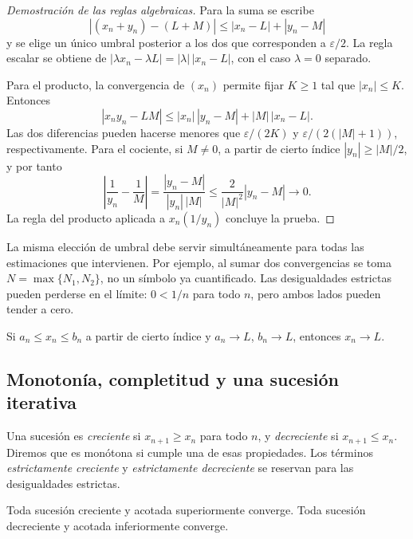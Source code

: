 \begin{proof}[Demostración de las reglas algebraicas]
Para la suma se escribe
\[
 |(x_n+y_n)-(L+M)|
 \le |x_n-L|+|y_n-M|
\]
y se elige un único umbral posterior a los dos que corresponden a
\(\varepsilon/2\). La regla escalar se obtiene de
\(|\lambda x_n-\lambda L|=|\lambda|\,|x_n-L|\), con el caso
\(\lambda=0\) separado.

Para el producto, la convergencia de \((x_n)\) permite fijar \(K\ge1\) tal
que \(|x_n|\le K\). Entonces
\[
 |x_ny_n-LM|
 \le |x_n|\,|y_n-M|+|M|\,|x_n-L|.
\]
Las dos diferencias pueden hacerse menores que
\(\varepsilon/(2K)\) y \(\varepsilon/(2(|M|+1))\), respectivamente. Para el
cociente, si \(M\ne0\), a partir de cierto índice
\(|y_n|\ge|M|/2\), y por tanto
\[
 \left|\frac1{y_n}-\frac1M\right|
 =\frac{|y_n-M|}{|y_n|\,|M|}
 \le\frac{2}{|M|^2}|y_n-M|\longrightarrow0.
\]
La regla del producto aplicada a \(x_n(1/y_n)\) concluye la prueba.
\end{proof}

La misma elección de umbral debe servir simultáneamente para todas las
estimaciones que intervienen. Por ejemplo, al sumar dos convergencias se toma
\(N=\max\{N_1,N_2\}\), no un símbolo ya cuantificado. Las desigualdades
estrictas pueden perderse en el límite: \(0<1/n\) para todo \(n\), pero ambos
lados pueden tender a cero.

\begin{teorema}
Si \(a_n\le x_n\le b_n\) a partir de cierto índice y
\(a_n\to L\), \(b_n\to L\), entonces \(x_n\to L\).
\end{teorema}

\subsection{Monotonía, completitud y una sucesión iterativa}

Una sucesión es \emph{creciente} si \(x_{n+1}\ge x_n\) para todo \(n\), y
\emph{decreciente} si \(x_{n+1}\le x_n\). Diremos que es monótona si cumple
una de esas propiedades. Los términos \emph{estrictamente creciente} y
\emph{estrictamente decreciente} se reservan para las desigualdades estrictas.

\begin{teorema}
Toda sucesión creciente y acotada superiormente converge. Toda sucesión
decreciente y acotada inferiormente converge.
\end{teorema}

